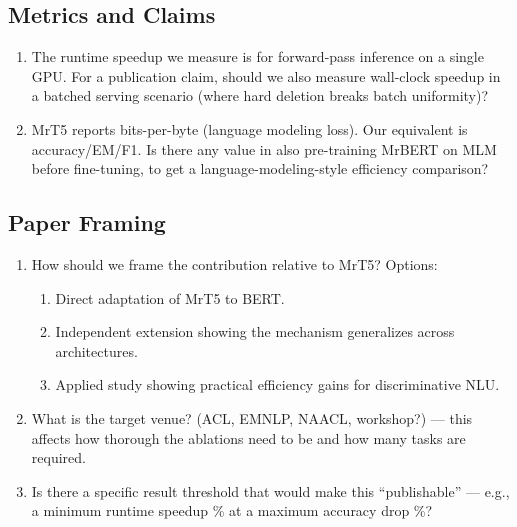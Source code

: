 \documentclass[11pt,a4paper]{article}
\begin{document}
\subsection{Metrics and Claims}

\begin{enumerate}[resume]
    \item The runtime speedup we measure is for forward-pass inference on a single GPU. For a publication claim, should we also measure wall-clock speedup in a batched serving scenario (where hard deletion breaks batch uniformity)?
    \item MrT5 reports bits-per-byte (language modeling loss). Our equivalent is accuracy/EM/F1. Is there any value in also pre-training MrBERT on MLM before fine-tuning, to get a language-modeling-style efficiency comparison?
\end{enumerate}

\subsection{Paper Framing}

\begin{enumerate}[resume]
    \item How should we frame the contribution relative to MrT5? Options:
    \begin{enumerate}[label=(\alph*)]
        \item Direct adaptation of MrT5 to BERT.
        \item Independent extension showing the mechanism generalizes across architectures.
        \item Applied study showing practical efficiency gains for discriminative NLU.
    \end{enumerate}
    \item What is the target venue? (ACL, EMNLP, NAACL, workshop?) --- this affects how thorough the ablations need to be and how many tasks are required.
    \item Is there a specific result threshold that would make this ``publishable'' --- e.g., a minimum runtime speedup \% at a maximum accuracy drop \%?
\end{enumerate}
\end{document}

